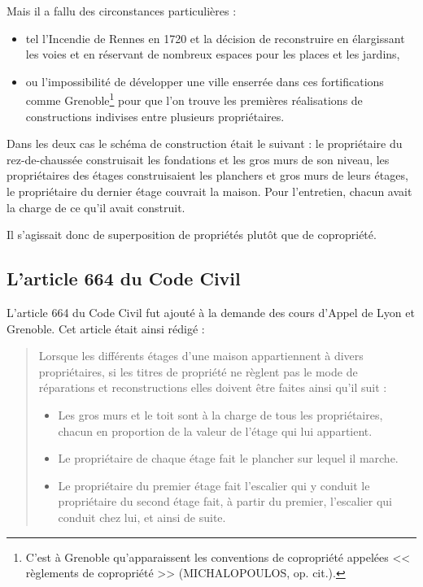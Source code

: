 		Mais il a fallu des circonstances particulières :
		\begin{itemize}
			\item tel l'Incendie de Rennes en 1720 et la décision de reconstruire en élargissant les voies et en réservant de nombreux espaces pour les places et les jardins,
			\item ou l'impossibilité de développer une ville enserrée dans ces fortifications comme Grenoble\footnote{C'est à Grenoble qu'apparaissent les conventions de copropriété appelées << règlements de copropriété >> (MICHALOPOULOS, op. cit.).} pour que l'on trouve les premières réalisations de constructions indivises entre plusieurs propriétaires.
		\end{itemize}
		
		\par Dans les deux cas le schéma de construction était le suivant : le propriétaire du rez-de-chaussée construisait les fondations et les gros murs de son niveau, les propriétaires des étages construisaient les planchers et gros murs de leurs étages, le propriétaire du dernier étage couvrait la maison. Pour l'entretien, chacun avait la charge de ce qu'il avait construit.
		
		Il s’agissait donc de superposition de propriétés plutôt que de copropriété.
		
	\subsection{L'article 664 du Code Civil}
		L'article 664 du Code Civil fut ajouté à la demande des cours d'Appel de Lyon et Grenoble. Cet article était ainsi rédigé :
		\begin{quote}
			Lorsque les différents étages d'une maison appartiennent à divers propriétaires, si les titres de propriété ne règlent pas le mode de réparations et reconstructions elles doivent être faites ainsi qu'il suit :
			\begin{itemize}
				\item  Les gros murs et le toit sont à la charge de tous les propriétaires, chacun en proportion de la valeur de l'étage qui lui appartient.
				\item  Le propriétaire de chaque étage fait le plancher sur lequel il marche.
				\item  Le propriétaire du premier étage fait l'escalier qui y conduit le propriétaire du second étage fait, à partir du premier, l'escalier qui conduit chez lui, et ainsi de suite.
			\end{itemize}
		\end{quote}
	
